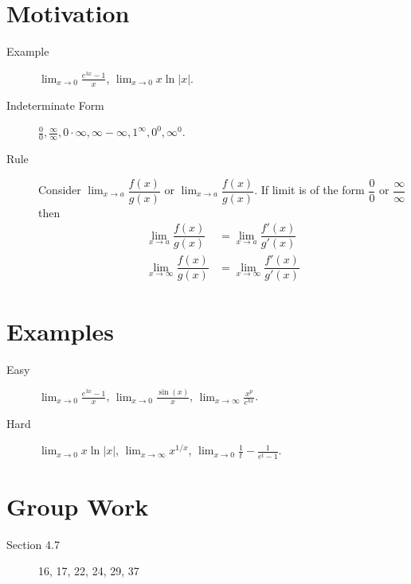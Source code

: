 \documentclass[11pt]{article}
\newcommand{\ds}{\displaystyle}
\begin{document}
\drawtitle

\section*{Motivation}
\begin{description}
\item[Example] $\ds \lim_{x\rightarrow 0}\frac{e^{3x}-1}{x}$,
  $\ds\lim_{x\to 0}x\ln|x|$.
\item[Indeterminate Form] $\ds\frac{0}{0}, \frac{\infty}{\infty},
  0\cdot\infty, \infty-\infty, 1^\infty, 0^0, \infty^0$.
\item[Rule] Consider $\ds\lim_{x\to a}\dfrac{f(x)}{g(x)}$ or
  $\ds\lim_{x\to a}\dfrac{f(x)}{g(x)}$.  If limit is of the form
  $\dfrac{0}{0}$ or $\dfrac{\infty}{\infty}$ then
  \begin{align*}
    \ds\lim_{x\to a}\dfrac{f(x)}{g(x)} &=\ds\lim_{x\to a}
      \dfrac{f'(x)}{g'(x)}\\
    \ds\lim_{x\to\infty}\dfrac{f(x)}{g(x)} &=\ds\lim_{x\to
      \infty}\dfrac{f'(x)}{g'(x)}
  \end{align*}

\end{description}

\section*{Examples}
\begin{description}
\item[Easy] $\ds \lim_{x\rightarrow 0}\frac{e^{3x}-1}{x}$,
  $\ds\lim_{x\to 0}\frac{\sin(x)}{x}$, $\ds\lim_{x\to\infty}
  \frac{x^p}{e^{kx}}$.
\item[Hard] $\ds\lim_{x\to 0}x\ln|x|$, $\ds\lim_{x\to \infty}x^{1/x}$,
  $\ds\lim_{x\to 0}\frac{1}{t}-\frac{1}{e^t-1}$.
\end{description}

\section*{Group Work}
\begin{description}
\item[Section 4.7] 16, 17, 22, 24, 29, 37
\end{description}
\end{document}
